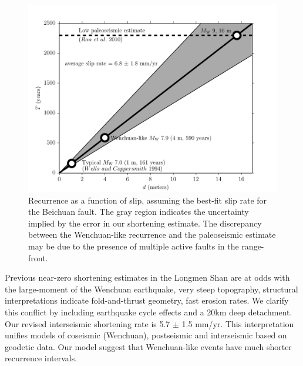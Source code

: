 \documentclass[12pt]{article}
\begin{document}
\begin{figure}[h!]
    \centering
    \includegraphics{figs/hazard_all_details.pdf}
    \caption{Recurrence as a function of slip, assuming the best-fit slip rate for the Beichuan fault. The gray region indicates the uncertainty implied by the error in our shortening estimate. The discrepancy between the Wenchuan-like recurrence and the paleoseismic estimate may be due to the presence of multiple active faults in the range-front.}
    \label{fig:hazard}
\end{figure}

Previous near-zero shortening estimates in the Longmen Shan are at odds with the large-moment of the Wenchuan earthquake, very steep topography, structural interpretations indicate fold-and-thrust geometry, fast erosion rates. We clarify this conflict by including earthquake cycle effects and a 20km deep detachment. Our revised interseismic shortening rate is 5.7 $\pm$ 1.5 mm/yr. This interpretation unifies models of coseismic (Wenchuan), postseismic and interseismic  based on geodetic data. Our model suggest that Wenchuan-like events have much shorter recurrence intervals.



\end{document}
